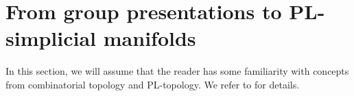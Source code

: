 \documentclass[a4paper, reqno]{amsart}
\newtheorem{lemma}[proposition]{Lemma}
\theoremstyle{definition}
\theoremstyle{remark}
\newcommand{\comm}[2]{%
  {\color{red}#1: #2}}
\renewcommand{\~}{\nobreak\ }
\begin{document}






\section{From group presentations to PL-simplicial manifolds}\label{section:presentation-to-pl}
In this section, we will assume that the reader has some familiarity with concepts from combinatorial topology and PL-topology. We refer to \cite{zeeman,hudson,Glaser,rourkesandersonnew,friedlmonster} for details.  
\end{document}
